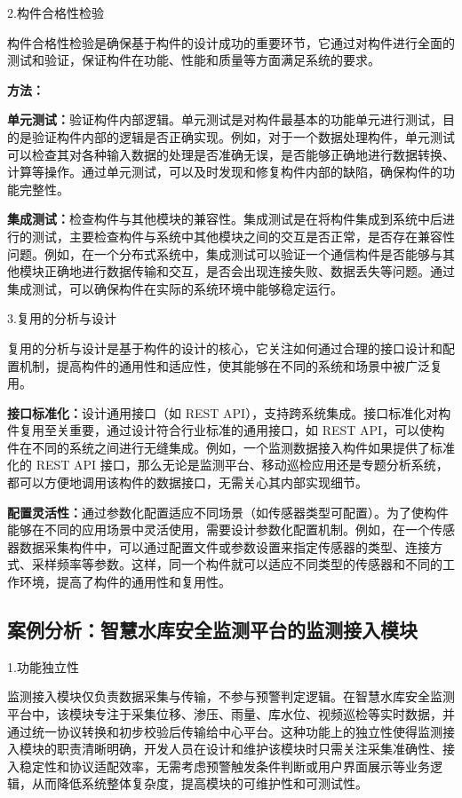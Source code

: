 2.构件合格性检验

构件合格性检验是确保基于构件的设计成功的重要环节，它通过对构件进行全面的测试和验证，保证构件在功能、性能和质量等方面满足系统的要求。

\textbf{方法：}

\textbf{单元测试：}验证构件内部逻辑。单元测试是对构件最基本的功能单元进行测试，目的是验证构件内部的逻辑是否正确实现。例如，对于一个数据处理构件，单元测试可以检查其对各种输入数据的处理是否准确无误，是否能够正确地进行数据转换、计算等操作。通过单元测试，可以及时发现和修复构件内部的缺陷，确保构件的功能完整性。

\textbf{集成测试：}检查构件与其他模块的兼容性。集成测试是在将构件集成到系统中后进行的测试，主要检查构件与系统中其他模块之间的交互是否正常，是否存在兼容性问题。例如，在一个分布式系统中，集成测试可以验证一个通信构件是否能够与其他模块正确地进行数据传输和交互，是否会出现连接失败、数据丢失等问题。通过集成测试，可以确保构件在实际的系统环境中能够稳定运行。

3.复用的分析与设计

复用的分析与设计是基于构件的设计的核心，它关注如何通过合理的接口设计和配置机制，提高构件的通用性和适应性，使其能够在不同的系统和场景中被广泛复用。

\textbf{接口标准化：}设计通用接口（如 REST API），支持跨系统集成。接口标准化对构件复用至关重要，通过设计符合行业标准的通用接口，如 REST API，可以使构件在不同的系统之间进行无缝集成。例如，一个监测数据接入构件如果提供了标准化的 REST API 接口，那么无论是监测平台、移动巡检应用还是专题分析系统，都可以方便地调用该构件的数据接口，无需关心其内部实现细节。

\textbf{配置灵活性：}通过参数化配置适应不同场景（如传感器类型可配置）。为了使构件能够在不同的应用场景中灵活使用，需要设计参数化配置机制。例如，在一个传感器数据采集构件中，可以通过配置文件或参数设置来指定传感器的类型、连接方式、采样频率等参数。这样，同一个构件就可以适应不同类型的传感器和不同的工作环境，提高了构件的通用性和复用性。

\subsection{案例分析：智慧水库安全监测平台的监测接入模块}

1.功能独立性

监测接入模块仅负责数据采集与传输，不参与预警判定逻辑。在智慧水库安全监测平台中，该模块专注于采集位移、渗压、雨量、库水位、视频巡检等实时数据，并通过统一协议转换和初步校验后传输给中心平台。这种功能上的独立性使得监测接入模块的职责清晰明确，开发人员在设计和维护该模块时只需关注采集准确性、接入稳定性和协议适配效率，无需考虑预警触发条件判断或用户界面展示等业务逻辑，从而降低系统整体复杂度，提高模块的可维护性和可测试性。


